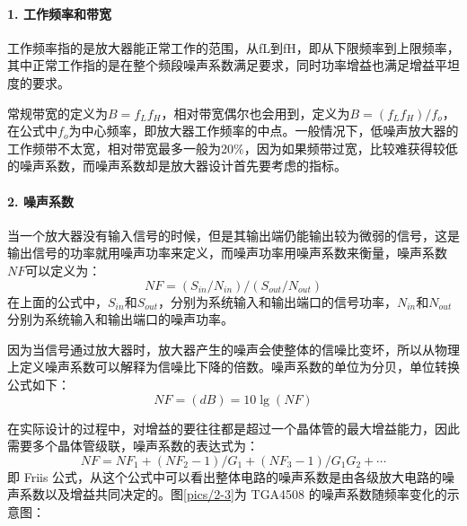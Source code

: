 \paragraph{1. 工作频率和带宽} 工作频率指的是放大器能正常工作的范围，从fL到fH，即从下限频率到上限频率，其中正常工作指的是在整个频段噪声系数满足要求，同时功率增益也满足增益平坦度的要求。

常规带宽的定义为$B=f_Lf_H$，相对带宽偶尔也会用到，定义为$B=(f_Lf_H)/f_o$，在公式中$f_o$为中心频率，即放大器工作频率的中点。一般情况下，低噪声放大器的工作频带不太宽，相对带宽最多一般为20\%，因为如果频带过宽，比较难获得较低的噪声系数，而噪声系数却是放大器设计首先要考虑的指标。

\paragraph{2. 噪声系数}
当一个放大器没有输入信号的时候，但是其输出端仍能输出较为微弱的信号，这是输出信号的功率就用噪声功率来定义，而噪声功率用噪声系数来衡量，噪声系数$NF$可以定义为：
\begin{equation}%
NF=(S_{in}/N_{in})/(S_{out}/N_{out})
\end{equation}
在上面的公式中，$S_{in}$和$S_{out}$，分别为系统输入和输出端口的信号功率，$N_{in}$和$N_{out}$分别为系统输入和输出端口的噪声功率。

因为当信号通过放大器时，放大器产生的噪声会使整体的信噪比变坏，所以从物理上定义噪声系数可以解释为信噪比下降的倍数。噪声系数的单位为分贝，单位转换公式如下：
\begin{equation}%
NF=(dB) = 10\lg(NF)
\end{equation}

在实际设计的过程中，对增益的要往往都是超过一个晶体管的最大增益能力，因此需要多个晶体管级联，噪声系数的表达式为：
\begin{equation}%
NF=NF_1+(NF_2-1)/G_1+(NF_3-1)/G_1G_2+\cdots
\end{equation}
即 Friis 公式，从这个公式中可以看出整体电路的噪声系数是由各级放大电路的噪声系数以及增益共同决定的。图\ref{pics/2-3}为 TGA4508 的噪声系数随频率变化的示意图：
